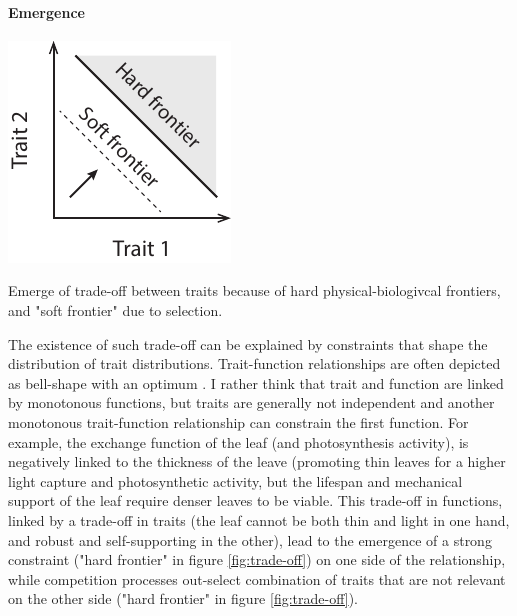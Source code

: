 \paragraph{Emergence}


\begin{marginfigure}
    \includegraphics{./Figures/trade_off_emergence_m.pdf}
  \caption[Trade-off emergence]{Emerge of trade-off between traits because of hard physical-biologivcal frontiers, and "soft frontier" due to selection.}
  \label{fg:insurance}
\end{marginfigure}

The existence of such trade-off can be explained by constraints that shape the distribution of trait distributions. Trait-function relationships are often depicted as bell-shape with an optimum \parencite{albert_intraspecific_2010}. I rather think that trait and function are linked by monotonous functions, but traits are generally not independent and another monotonous trait-function relationship can constrain the first function. For example, the exchange function of the leaf (and photosynthesis activity), is negatively linked to the thickness of the leave (promoting thin leaves for a higher light capture and photosynthetic activity, but the lifespan and mechanical support of the leaf require denser leaves to be viable. This trade-off in functions, linked by a trade-off in traits (the leaf cannot be both thin and light in one hand, and robust and self-supporting in the other), lead to the emergence of a strong constraint ("hard frontier" in figure \ref{fig:trade-off}) on one side of the relationship, while competition processes out-select combination of traits that are not relevant on the other side ("hard frontier" in figure \ref{fig:trade-off}).



